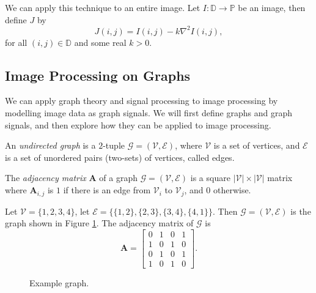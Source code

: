 \documentclass[12pt]{article}
\begin{document}
We can apply this technique to an entire image. Let $I: \mathbb{D} \to \mathbb{P}$ be an image, then define $J$ by \[J(i, j) = I(i, j) - k\nabla^2I(i, j),\] for all $(i, j) \in \mathbb{D}$ and some real $k > 0$.

\subsection{Image Processing on Graphs}

We can apply graph theory and signal processing to image processing by modelling image data as graph signals. We will first define graphs and graph signals, and then explore how they can be applied to image processing.

\begin{defn}
    An \emph{undirected graph} is a $2$-tuple $\mathcal{G} = (\mathcal{V}, \mathcal{E})$, where $\mathcal{V}$ is a set of vertices, and $\mathcal{E}$ is a set of unordered pairs (two-sets) of vertices, called edges.
\end{defn}

\begin{defn}
    The \emph{adjacency matrix} $\bm{A}$ of a graph $\mathcal{G} = (\mathcal{V}, \mathcal{E})$ is a square $|\mathcal{V}| \times |\mathcal{V}|$ matrix where $\bm{A}_{i, j}$ is $1$ if there is an edge from $\mathcal{V}_i$ to $\mathcal{V}_j$, and $0$ otherwise.
\end{defn}

\begin{exmp}
    Let $\mathcal{V} = \{1, 2, 3, 4\}$, let $\mathcal{E} = \{\{1, 2\}, \{2, 3\}, \{3, 4\}, \{4, 1\}\}$. Then $\mathcal{G} = (\mathcal{V}, \mathcal{E})$ is the graph shown in Figure \ref{fig:example-graph}. The adjacency matrix of $\mathcal{G}$ is
    \[\bm{A} = \begin{bmatrix}
        0 & 1 & 0 & 1 \\
        1 & 0 & 1 & 0 \\
        0 & 1 & 0 & 1 \\
        1 & 0 & 1 & 0
    \end{bmatrix}.\]
\end{exmp}

\begin{figure}[ht!]
    \centering
\caption{Example graph.}
\label{fig:example-graph}
\end{figure}
\end{document}
